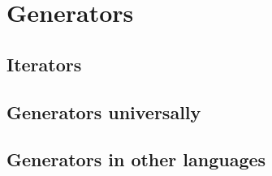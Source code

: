 \chapter{Generators}

\section{Iterators}

\section{Generators universally}

\section{Generators in other languages}



